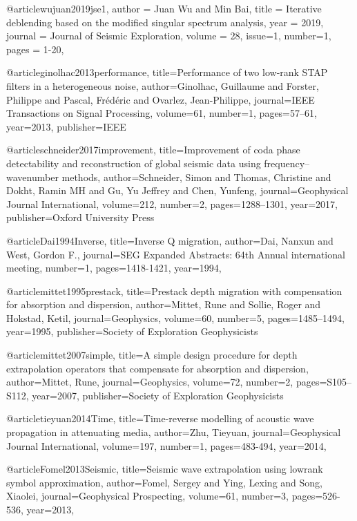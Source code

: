 {@article{wujuan2019jse1,
  author =	 {Juan Wu and Min Bai},
  title =	 {Iterative deblending based on the modified singular spectrum analysis},
  year =	 2019,
  journal =	 {Journal of Seismic Exploration},
  volume =	 28,
  issue=1,
  number=1,
  pages =	 {1-20},
}



@article{ginolhac2013performance,
  title={Performance of two low-rank STAP filters in a heterogeneous noise},
  author={Ginolhac, Guillaume and Forster, Philippe and Pascal, Fr{\'e}d{\'e}ric and Ovarlez, Jean-Philippe},
  journal={IEEE Transactions on Signal Processing},
  volume={61},
  number={1},
  pages={57--61},
  year={2013},
  publisher={IEEE}
}


@article{schneider2017improvement,
  title={Improvement of coda phase detectability and reconstruction of global seismic data using frequency--wavenumber methods},
  author={Schneider, Simon and Thomas, Christine and Dokht, Ramin MH and Gu, Yu Jeffrey and Chen, Yunfeng},
  journal={Geophysical Journal International},
  volume={212},
  number={2},
  pages={1288--1301},
  year={2017},
  publisher={Oxford University Press}
}




@article{Dai1994Inverse,
  title={Inverse {Q} migration},
  author={Dai, Nanxun and West, Gordon F.},
  journal={SEG Expanded Abstracts: 64th Annual international meeting},
  number={1},
  pages={1418-1421},
  year={1994},
}

@article{mittet1995prestack,
  title={Prestack depth migration with compensation for absorption and dispersion},
  author={Mittet, Rune and Sollie, Roger and Hokstad, Ketil},
  journal={Geophysics},
  volume={60},
  number={5},
  pages={1485--1494},
  year={1995},
  publisher={Society of Exploration Geophysicists}
}

@article{mittet2007simple,
  title={A simple design procedure for depth extrapolation operators that compensate for absorption and dispersion},
  author={Mittet, Rune},
  journal={Geophysics},
  volume={72},
  number={2},
  pages={S105--S112},
  year={2007},
  publisher={Society of Exploration Geophysicists}
}

@article{tieyuan2014Time,
  title={Time-reverse modelling of acoustic wave propagation in attenuating media},
  author={Zhu, Tieyuan},
  journal={Geophysical Journal International},
  volume={197},
  number={1},
  pages={483-494},
  year={2014},
}

@article{Fomel2013Seismic,
  title={Seismic wave extrapolation using lowrank symbol approximation},
  author={Fomel, Sergey and Ying, Lexing and Song, Xiaolei},
  journal={Geophysical Prospecting},
  volume={61},
  number={3},
  pages={526-536},
  year={2013},
}

}
